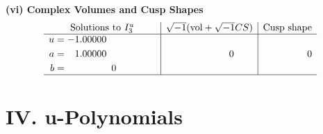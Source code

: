 \documentclass[1p]{elsarticle_modified}
\theoremstyle{definition}
\newcommand{\I}{\sqrt{-1}}
\begin{document}
\newpage\flushleft \textbf{(vi) Complex Volumes and Cusp Shapes}
$$\begin{array}{c|c|c}  
\text{Solutions to }I^u_{3}& \I (\text{vol} + \sqrt{-1}CS) & \text{Cusp shape}\\
 \hline 
\begin{aligned}
u &= -1.00000\phantom{ +0.000000I} \\
a &= \phantom{-}1.00000\phantom{ +0.000000I} \\
b &= \phantom{-0.000000 } 0\end{aligned}
 & \phantom{-0.000000 } 0 & \phantom{-0.000000 } 0\\
 \hline 
 \end{array}$$\newpage
\newpage\renewcommand{\arraystretch}{1}
\centering \section*{ IV. u-Polynomials}
\end{document}
